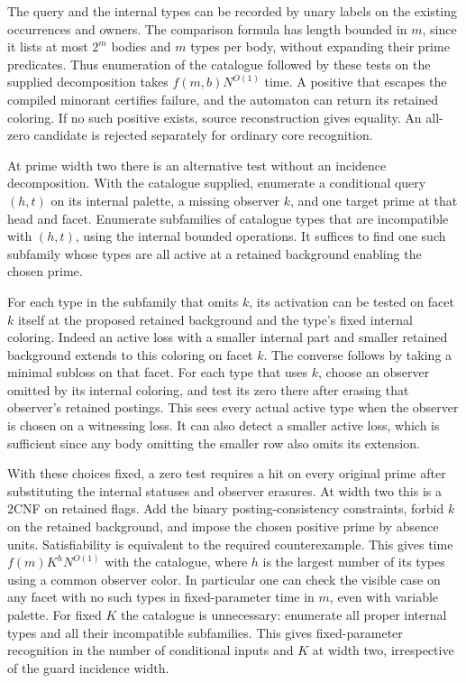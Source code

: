 The query and the internal types can be
recorded by unary labels on the existing
occurrences and owners. The comparison
formula has length bounded in $m$, since
it lists at most $2^m$ bodies and $m$
types per body, without expanding their
prime predicates. Thus enumeration of
the catalogue followed by these tests on
the supplied decomposition takes
$f(m,b)N^{O(1)}$ time. A positive that
escapes the compiled minorant certifies
failure, and the automaton can return
its retained coloring. If no such
positive exists, source reconstruction
gives equality. An all-zero candidate is
rejected separately for ordinary core
recognition.

At prime width two there is an alternative
test without an incidence decomposition.
With the catalogue supplied, enumerate a
conditional query $(h,t)$ on its internal
palette, a missing observer $k$, and one
target prime at that head and facet.
Enumerate subfamilies of catalogue types
that are incompatible with $(h,t)$,
using the internal bounded operations.
It suffices to find one such subfamily
whose types are all active at a retained
background enabling the chosen prime.

For each type in the subfamily that omits
$k$, its activation can be tested on
facet $k$ itself at the proposed retained
background and the type's fixed internal
coloring. Indeed an active loss with a
smaller internal part and smaller retained
background extends to this coloring on
facet $k$. The converse follows by taking
a minimal subloss on that facet. For each
type that uses $k$, choose an observer
omitted by its internal coloring, and
test its zero there after erasing that
observer's retained postings. This sees every actual active type when
the observer is chosen on a witnessing
loss. It can also detect a smaller
active loss, which is sufficient since
any body omitting the smaller row
also omits its extension.

With these choices fixed, a zero test
requires a hit on every original prime
after substituting the internal statuses
and observer erasures. At width two this
is a 2CNF on retained flags. Add the
binary posting-consistency constraints,
forbid $k$ on the retained background,
and impose the chosen positive prime by
absence units. Satisfiability is equivalent
to the required counterexample. This
gives time $f(m)K^hN^{O(1)}$ with the
catalogue, where $h$ is the largest
number of its types using a common
observer color. In particular one can
check the visible case on any facet
with no such types in fixed-parameter
time in $m$, even with variable palette.
For fixed $K$ the catalogue is unnecessary:
enumerate all proper internal types and
all their incompatible subfamilies.
This gives fixed-parameter recognition
in the number of conditional inputs and
$K$ at width two, irrespective of the
guard incidence width.

